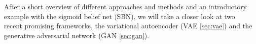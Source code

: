 

After a short overview of different approaches and methods and an introductory example with the sigmoid belief net (SBN), we will take a closer look at two recent promising frameworks, the variational autoencoder (VAE \ref{sec:vae}) and the generative adversarial network (GAN \ref{sec:gan}).











